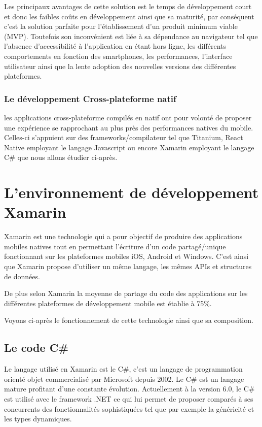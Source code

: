 \documentclass[11]{article}
\begin{document}
 \vspace{0.5cm}
 
Les principaux avantages de cette solution est le temps de développement court et donc les faibles coûts en développement ainsi que sa maturité, par conséquent c’est la solution parfaite pour l’établissement d’un produit minimum viable (MVP). 
Toutefois son inconvénient est liée à sa dépendance au navigateur tel que l’absence d’accessibilité à l’application en étant hors ligne, les différents comportements en fonction des smartphones, les performances, l’interface utilisateur ainsi que la lente adoption des nouvelles versions des différentes plateformes.


\subsubsection{Le développement Cross-plateforme natif}
les applications cross-plateforme compilés en natif ont pour volonté de proposer une expérience se rapprochant au plus près des performances natives du mobile. Celles-ci s'appuient sur des frameworks/compilateur tel que Titanium, React Native employant le langage Javascript ou encore Xamarin employant le langage C\# que nous allons étudier ci-après.


\section{L'environnement de développement Xamarin}
Xamarin est une technologie qui a pour objectif de produire des applications mobiles natives tout en permettant l'écriture d’un code partagé/unique fonctionnant sur les plateformes mobiles iOS, Android et Windows. C’est ainsi que Xamarin propose d’utiliser un même langage, les mêmes APIs  et structures de données.
     
 \vspace{0.5cm}
 
De plus selon Xamarin la moyenne de partage du code des applications sur les différentes plateformes de développement mobile est établie à 75\%.
     
 \vspace{0.5cm}
 
Voyons ci-après le fonctionnement de cette technologie ainsi que sa composition.

\subsection{Le code C\#}
Le langage utilisé en Xamarin est le C\#, c’est un langage de programmation orienté objet commercialisé par Microsoft depuis 2002. Le C\# est un langage mature profitant d’une constante évolution. Actuellement à la version 6.0, le C\# est utilisé avec le framework .NET ce qui lui permet de proposer comparés à ses concurrents des fonctionnalités sophistiquées tel que par exemple la généricité et les types dynamiques.
 
\end{document}
